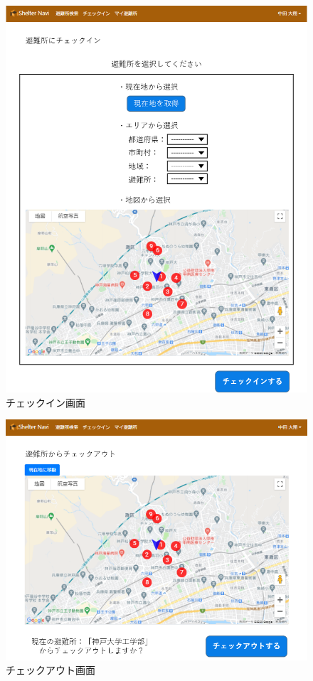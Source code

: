 \documentclass[technicalreport,dvipdfmx]{ieicej}
\begin{document}
\begin{figure}[htbp]
     \begin{center}
          \includegraphics[scale=0.6,pagebox=cropbox,clip]{img/checkin.png}
          \caption{チェックイン画面}
          \label{fig:checkin}
     \end{center}
\end{figure}

\begin{figure}[htbp]
     \begin{center}
          \includegraphics[scale=0.6,pagebox=cropbox,clip]{img/checkout.png}
          \caption{チェックアウト画面}
          \label{fig:checkout}
     \end{center}
\end{figure}
\end{document}
